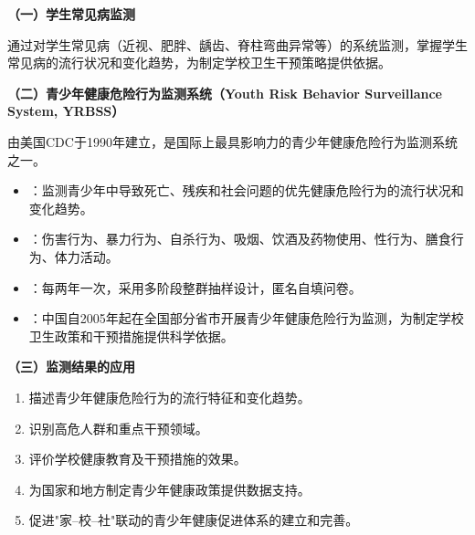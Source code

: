 \begin{defbox}
\textbf{（一）学生常见病监测}

通过对学生常见病（近视、肥胖、龋齿、脊柱弯曲异常等）的系统监测，掌握学生常见病的流行状况和变化趋势，为制定学校卫生干预策略提供依据。

\textbf{（二）青少年健康危险行为监测系统（Youth Risk Behavior Surveillance System, YRBSS）}

由美国CDC于1990年建立，是国际上最具影响力的青少年健康危险行为监测系统之一。

\begin{itemize}[leftmargin=*]
    \item {}：监测青少年中导致死亡、残疾和社会问题的优先健康危险行为的流行状况和变化趋势。
    \item {}：伤害行为、暴力行为、自杀行为、吸烟、饮酒及药物使用、性行为、膳食行为、体力活动。
    \item {}：每两年一次，采用多阶段整群抽样设计，匿名自填问卷。
    \item {}：中国自2005年起在全国部分省市开展青少年健康危险行为监测，为制定学校卫生政策和干预措施提供科学依据。
\end{itemize}

\textbf{（三）监测结果的应用}

\begin{enumerate}[leftmargin=*]
    \item 描述青少年健康危险行为的流行特征和变化趋势。
    \item 识别高危人群和重点干预领域。
    \item 评价学校健康教育及干预措施的效果。
    \item 为国家和地方制定青少年健康政策提供数据支持。
    \item 促进"家--校--社"联动的青少年健康促进体系的建立和完善。
\end{enumerate}
\end{defbox}

\newpage

